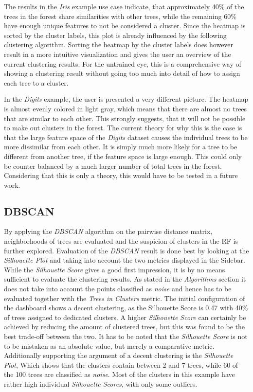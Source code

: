 \documentclass[a4paper, 12pt]{article}
\begin{document}
The results in the \textit{Iris} example use case indicate, that approximately 40\% of the trees in the
forest share similarities with other trees, while the remaining 60\% have enough unique features to not be
considered a cluster. Since the heatmap is sorted by the cluster labels, this plot is already influenced by
the following clustering algorithm. Sorting the heatmap by the cluster labels does however result in a more
intuitive visualization and gives the user an overview of the current clustering results. For the untrained
eye, this is a comprehensive way of showing a clustering result without going too much into detail of how
to assign each tree to a cluster. \par

In the \textit{Digits} example, the user is presented a very different picture. The heatmap is almost evenly
colored in light gray, which means that there are almost no trees that are similar to each other. This
strongly suggests, that it will not be possible to make out clusters in the forest. The current theory for
why this is the case is that the large feature space of the \textit{Digits} dataset causes the individual
trees to be more dissimilar from each other. It is simply much more likely for a tree to be different from
another tree, if the feature space is large enough. This could only be counter balanced by a much larger
number of total trees in the forest. Considering that this is only a theory, this would have to be tested
in a future work.

\subsection{DBSCAN}
By applying the \textit{DBSCAN} algorithm on the pairwise distance matrix, neighborhoods of trees are evaluated
and the suspicion of clusters in the RF is further explored. Evaluation of the \textit{DBSCAN} result is done
best by looking at the \textit{Silhouette Plot} and taking into account the two metrics displayed in the
Sidebar. While the \textit{Silhouette Score} gives a good first impression, it is by no means sufficient to
evaluate the clustering results. As stated in the \textit{Algorithms} section it does not take into account the
points classified as \textit{noise} and hence has to be evaluated together with the \textit{Trees in Clusters}
metric. The initial configuration of the dashboard shows a decent clustering, as the Silhouette Score is 0.47
with 40\% of trees assigned to dedicated clusters. A higher \textit{Silhouette Score} can certainly be achieved
by reducing the amount of clustered trees, but this was found to be the best trade-off between the two. It has
to be noted that the \textit{Silhouette Score} is not to be mistaken as an absolute value, but merely a
comparative metric. Additionally supporting the argument of a decent clustering is the \textit{Silhouette Plot},
Which shows that the clusters contain between 2 and 7 trees, while 60 of the 100 trees are classified as
\textit{noise}. Most of the clusters in this example have rather high individual \textit{Silhouette Scores},
with only some outliers. \par
\end{document}
